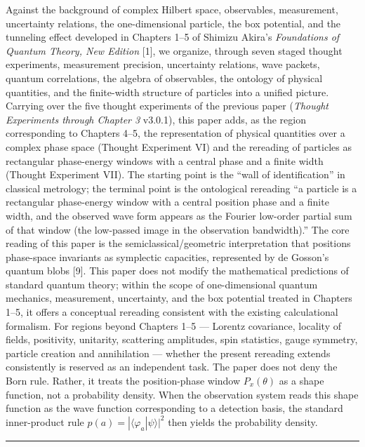 \documentclass[
]{article}
\begin{document}
Against the background of complex Hilbert space, observables,
measurement, uncertainty relations, the one-dimensional particle, the
box potential, and the tunneling effect developed in Chapters 1--5 of
Shimizu Akira's \emph{Foundations of Quantum Theory, New Edition}
{[}1{]}, we organize, through seven staged thought experiments,
measurement precision, uncertainty relations, wave packets, quantum
correlations, the algebra of observables, the ontology of physical
quantities, and the finite-width structure of particles into a unified
picture. Carrying over the five thought experiments of the previous
paper (\emph{Thought Experiments through Chapter 3} v3.0.1), this paper
adds, as the region corresponding to Chapters 4--5, the representation
of physical quantities over a complex phase space (Thought Experiment
VI) and the rereading of particles as rectangular phase-energy windows
with a central phase and a finite width (Thought Experiment VII). The
starting point is the ``wall of identification'' in classical metrology;
the terminal point is the ontological rereading ``a particle is a
rectangular phase-energy window with a central position phase and a
finite width, and the observed wave form appears as the Fourier
low-order partial sum of that window (the low-passed image in the
observation bandwidth).'' The core reading of this paper is the
semiclassical/geometric interpretation that positions phase-space
invariants as symplectic capacities, represented by de Gosson's quantum
blobs {[}9{]}. This paper does not modify the mathematical predictions
of standard quantum theory; within the scope of one-dimensional quantum
mechanics, measurement, uncertainty, and the box potential treated in
Chapters 1--5, it offers a conceptual rereading consistent with the
existing calculational formalism. For regions beyond Chapters 1--5 ---
Lorentz covariance, locality of fields, positivity, unitarity,
scattering amplitudes, spin statistics, gauge symmetry, particle
creation and annihilation --- whether the present rereading extends
consistently is reserved as an independent task. The paper does not deny
the Born rule. Rather, it treats the position-phase window
\(P_x(\theta)\) as a shape function, not a probability density. When the
observation system reads this shape function as the wave function
corresponding to a detection basis, the standard inner-product rule
\(p(a) = |\langle \varphi_a | \psi \rangle|^2\) then yields the
probability density.

\begin{center}\rule{0.5\linewidth}{0.5pt}\end{center}
\end{document}
